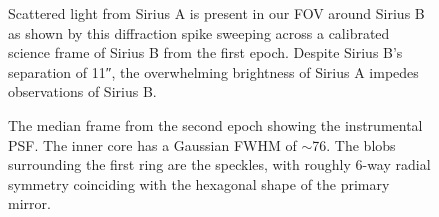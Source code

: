 \documentclass[twocolumn]{aastex631}
\newcommand\Lp{$\mathrm{L}^\prime$}
\begin{document}

\begin{figure}
    \centering
    \caption{Scattered light from Sirius A is present in our FOV around Sirius B as shown by this diffraction spike  sweeping across a calibrated science frame of Sirius B from the first epoch. Despite Sirius B's separation of \ang{;;11}, the overwhelming brightness of Sirius A impedes observations of Sirius B.}
    \label{fig:spike}
\end{figure}

\begin{figure}
    \centering
    \caption{The median frame from the second epoch showing the instrumental PSF. The inner core has a Gaussian FWHM of $\sim$\qty{76}{\milliarcsecond}. The blobs surrounding the first ring are the speckles, with roughly 6-way radial symmetry coinciding with the hexagonal shape of the primary mirror.}
    \label{fig:psf}
\end{figure}
\end{document}
